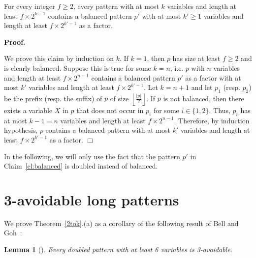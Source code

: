 \documentclass[]{elsart}
\def\floor#1{\left\lfloor #1 \right\rfloor}
\newenvironment{proof}{\par \noindent \textbf{Proof.}
}{\hfill$\Box$\medskip}
\newtheorem{lemma}[theorem]{Lemma}
\begin{document}
\begin{claim}\label{cl:balanced}
  For every integer $f\ge 2$, every pattern with at most $k$ variables and length
  at least $f\times 2^{k-1}$ contains a balanced pattern $p'$ with at most
  $k'\ge 1$ variables and length at least $f\times 2^{k'-1}$ as a factor.
\end{claim}

\begin{proof}
  We prove this claim by induction on $k$. If $k=1$, then $p$ has size
  at least $f\ge 2$ and is clearly balanced. Suppose this is true
  for some $k=n$, i.e. $p$ with $n$ variables and length at least
  $f\times 2^{n-1}$ contains a balanced pattern $p'$ as a factor
  with at most $k'$ variables and length at least $f\times
  2^{k'-1}$. Let $k=n+1$ and let $p_1$ (resp. $p_2$) be the prefix
  (resp. the suffix) of $p$ of size $\floor{\frac{|p|}{2}}$. If $p$
  is not balanced, then there exists a variable $X$ in $p$ that does
  not occur in $p_i$ for some $i\in\{1,2\}$. Thus, $p_i$ has 
  at most $k-1=n$ variables and length at least
  $f\times 2^{n-1}$. Therefore, by induction hypothesis, $p$
  contains a balanced pattern with at most $k'$ variables and
  length at least $f\times 2^{k'-1}$ as a factor.
\end{proof}

In the following, we will only use the fact that the pattern $p'$ in
Claim~\ref{cl:balanced} is doubled instead of balanced.

\section{3-avoidable long patterns}\label{3-a}
We prove Theorem~\ref{2tok}.(a) as a corollary of
the following result of Bell and Goh~\cite{BellGoh:2007}:
\begin{lemma}[\cite{BellGoh:2007}]
\label{k6doubled}
Every doubled pattern with at least 6 variables is 3-avoidable.
\end{lemma}
\end{document}
